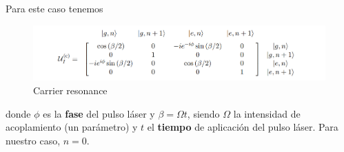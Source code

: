 Para este caso tenemos 

\begin{figure}[H]
    \centering 
    \includegraphics[width=1\linewidth]{Figuras/Fig_ions_U_carrier.png}
    \caption{Carrier resonance}
    \label{Fig_ions_U_carrier}
\end{figure}
donde $\phi$ es la \textbf{fase} del pulso láser y $\beta = \Omega t$, siendo $\Omega$ la intensidad de acoplamiento (un parámetro) y $t$ el \textbf{tiempo} de aplicación del pulso láser. Para nuestro caso, $n = 0$. 



